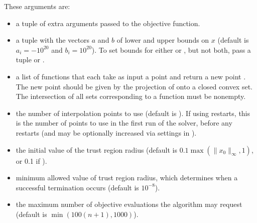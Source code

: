 \documentclass[letterpaper,10pt,english]{sphinxmanual}
\begin{document}
\sphinxAtStartPar
These arguments are:
\begin{itemize}
\item {} 
\sphinxAtStartPar
{} \sphinxhyphen{} a tuple of extra arguments passed to the objective function.

\item {} 
\sphinxAtStartPar
{} \sphinxhyphen{} a tuple  with the vectors \(a\) and \(b\) of lower and upper bounds on \(x\) (default is \(a_i=-10^{20}\) and \(b_i=10^{20}\)). To set bounds for either  or , but not both, pass a tuple  or .

\item {} 
\sphinxAtStartPar
{} \sphinxhyphen{} a list \sphinxcode{\sphinxupquote{{[}f1,f2,...,fn{]}}} of functions that each take as input a point  and return a new point . The new point  should be given by the projection of  onto a closed convex set. The intersection of all sets corresponding to a function must be non\sphinxhyphen{}empty.

\item {} 
\sphinxAtStartPar
{} \sphinxhyphen{} the number of interpolation points to use (default is ). If using restarts, this is the number of points to use in the first run of the solver, before any restarts (and may be optionally increased via settings in ).

\item {} 
\sphinxAtStartPar
{} \sphinxhyphen{} the initial value of the trust region radius (default is \(0.1\max(\|x_0\|_{\infty}, 1)\), or 0.1 if ).

\item {} 
\sphinxAtStartPar
{} \sphinxhyphen{} minimum allowed value of trust region radius, which determines when a successful termination occurs (default is \(10^{-8}\)).

\item {} 
\sphinxAtStartPar
{} \sphinxhyphen{} the maximum number of objective evaluations the algorithm may request (default is \(\min(100(n+1),1000)\)).


\end{itemize}
\end{document}
